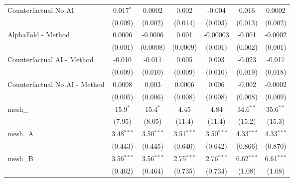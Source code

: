 \begin{tabular}{lcccccc}
   Counterfactual No AI                                        & 0.017$^{*}$   & 0.0002        & 0.002         & -0.004        & 0.016         & 0.0002\\   
                                                               & (0.009)       & (0.002)       & (0.014)       & (0.003)       & (0.013)       & (0.002)\\   
   AlphaFold - Method                                          & 0.0006        & -0.0006       & 0.001         & -0.00003      & -0.001        & -0.0002\\   
                                                               & (0.001)       & (0.0008)      & (0.0009)      & (0.001)       & (0.002)       & (0.001)\\   
   Counterfactual AI - Method                                  & -0.010        & -0.011        & 0.005         & 0.003         & -0.023        & -0.017\\   
                                                               & (0.009)       & (0.010)       & (0.009)       & (0.010)       & (0.019)       & (0.018)\\   
   Counterfactual No AI - Method                               & 0.0008        & 0.003         & 0.0006        & 0.006         & -0.002        & -0.0002\\   
                                                               & (0.005)       & (0.006)       & (0.008)       & (0.008)       & (0.008)       & (0.009)\\   
   mesh\_                                                      & 15.9$^{*}$    & 15.4$^{*}$    & 4.45          & 4.84          & 34.6$^{**}$   & 35.6$^{**}$\\   
                                                               & (7.95)        & (8.05)        & (11.4)        & (11.4)        & (15.2)        & (15.3)\\   
   mesh\_A                                                     & 3.48$^{***}$  & 3.50$^{***}$  & 3.51$^{***}$  & 3.50$^{***}$  & 4.33$^{***}$  & 4.33$^{***}$\\   
                                                               & (0.443)       & (0.445)       & (0.640)       & (0.642)       & (0.866)       & (0.870)\\   
   mesh\_B                                                     & 3.56$^{***}$  & 3.56$^{***}$  & 2.75$^{***}$  & 2.76$^{***}$  & 6.62$^{***}$  & 6.61$^{***}$\\   
                                                               & (0.462)       & (0.464)       & (0.735)       & (0.734)       & (1.08)        & (1.08)\\   

\end{tabular}
